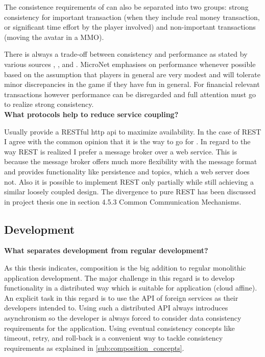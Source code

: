 The consistence requirements of \ogs{} can also be separated into two groups:
strong consistency for important transaction (when they include real money
transaction, or significant time effort by the player involved) and
non-important transactions (moving the avatar in a MMO).

There is always a trade-off between consistency and performance as stated by
various sources \cite{wada2011data}, \cite{olston2000offering}, and
\cite{franklin1997transactional}. MicroNet emphasises on performance whenever
possible based on the assumption that players in general are very modest and
will tolerate minor discrepancies in the game if they have fun in general. For
financial relevant transactions however performance can be disregarded and full
attention must go to realize strong consistency.\\

\noindent
\textbf{What protocols help to reduce service coupling?}

Usually \mss{} provide a RESTful \gls{http} \gls{api} to maximize availability.
In the case of REST I agree with the common opinion that it is the way to go for
\mss{}. In regard to the way REST is realized I prefer a message broker over a
web service. This is because the message broker offers much more flexibility with
the message format and provides functionality like persistence and topics, which
a web server does not. Also it is possible to implement REST only partially
while still achieving a similar loosely coupled design. The divergence to pure
REST has been discussed in project thesis one \cite{biedermann2015project1} in
section 4.5.3 Common Communication Mechanisms.\\

\subsection{\msuc{} Development}

\noindent
\textbf{What separates \ms{} development from regular development?}

As this thesis indicates, \ms{} composition is the big addition to regular
monolithic application development. The major challenge in this regard is to
develop functionality in a distributed way which is suitable for \ms{}
application (cloud affine). An explicit task in this regard is to use the API of
foreign services as their developers intended to. Using such a distributed
API always introduces asynchronism so the developer is always forced to consider
data consistency requirements for the application. Using eventual consistency
concepts like timeout, retry, and roll-back is a convenient way to tackle 
consistency requirements as explained in \autoref{sub:composition_concepts}.

